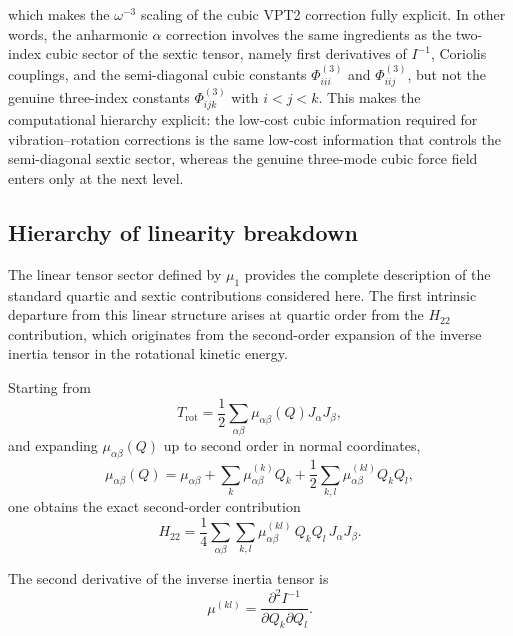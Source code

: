 \documentclass[aip,jcp,reprint,floatfix]{revtex4-2}
\begin{document}
which makes the $\omega^{-3}$ scaling of the cubic VPT2 correction
fully explicit. In other words, the anharmonic $\alpha$ correction
involves the same ingredients as the two-index cubic sector of the
sextic tensor, namely first derivatives of $I^{-1}$, Coriolis
couplings, and the semi-diagonal cubic constants $\Phi^{(3)}_{iii}$
and $\Phi^{(3)}_{iij}$, but not the genuine three-index constants
$\Phi^{(3)}_{ijk}$ with $i<j<k$. This makes the computational
hierarchy explicit: the low-cost cubic information required for
vibration--rotation corrections is the same low-cost information that
controls the semi-diagonal sextic sector, whereas the genuine
three-mode cubic force field enters only at the next level.


\subsection{Hierarchy of linearity breakdown}

The linear tensor sector defined by $\mu_1$ provides the complete
description of the standard quartic and sextic contributions
considered here. The first intrinsic departure from this linear
structure arises at quartic order from the $H_{22}$ contribution,
which originates from the second-order expansion of the inverse
inertia tensor in the rotational kinetic energy.

Starting from
\begin{equation}
T_{\mathrm{rot}} = \frac{1}{2} \sum_{\alpha\beta}
\mu_{\alpha\beta}(Q) J_\alpha J_\beta,
\end{equation}
and expanding $\mu_{\alpha\beta}(Q)$ up to second order in normal
coordinates,
\begin{equation}
\mu_{\alpha\beta}(Q)
=
\mu_{\alpha\beta}
+
\sum_k \mu^{(k)}_{\alpha\beta} Q_k
+
\frac{1}{2} \sum_{k,l} \mu^{(kl)}_{\alpha\beta} Q_k Q_l,
\end{equation}
one obtains the exact second-order contribution
\begin{equation}
H_{22}
=
\frac{1}{4}
\sum_{\alpha\beta}
\sum_{k,l}
\mu^{(kl)}_{\alpha\beta}
\, Q_k Q_l \,
J_\alpha J_\beta.
\end{equation}

The second derivative of the inverse inertia tensor is
\begin{equation}
\mu^{(kl)} =
\frac{\partial^2 I^{-1}}{\partial Q_k \partial Q_l}.
\end{equation}
\end{document}
